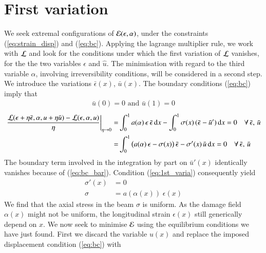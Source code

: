 \documentclass[final,3p,times,authoryear]{elsarticle}
\renewcommand*\d{\mathop{}\!\mathrm{d}} %
\begin{document}
\section{First variation} \label{sec:1st_varia}
%
%
%
%
%
%
%
We seek extremal configurations of ${\cal E}(\epsilon,\alpha)$, under the constraints (\ref{eq:strain_disp}) and (\ref{eq:bc}).
Applying the lagrange multiplier rule, we work with ${\cal L}$ and look for the conditions under which the first variation of ${\cal L}$ vanishes, for the the two variables $\epsilon$ and $\hat{u}$.
The minimisation with regard to the third variable $\alpha$, involving irreversibility conditions, will be considered in a second step.
We introduce the variations $\bar{\epsilon}(x)$, $\bar{u}(x)$. The boundary conditions (\ref{eq:bc}) imply that
\begin{align}
\label{eq:bc_bar}
\bar{u}(0)=0 \text{ and } \bar{u}(1)=0
\end{align}
%
\begin{subequations}
\label{sys:1st_varia}
\begin{align}
\left. \frac{{\cal L}(\epsilon+\eta\bar{\epsilon},\alpha,u+\eta \bar{u})-{\cal L}(\epsilon,\alpha,u)}{\eta} \right|_{\eta \to 0} = &
\int_0^1 a(\alpha) \, \epsilon \, \bar{\epsilon} \d x -
\int_0^1 \sigma(x)  \,  (\bar{\epsilon}-\bar{u}') \d x = 0 \quad \forall \, \bar{\epsilon}, \, \bar{u}
\\
= & \int_0^1 \big( a(\alpha) \, \epsilon - \sigma(x) \big) \, \bar{\epsilon} - \sigma'(x) \, \bar{u} \d x
= 0 \quad \forall \, \bar{\epsilon}, \, \bar{u} \label{eq:1st_varia}
\end{align}
\end{subequations}
The boundary term involved in the integration by part on $\bar{u}'(x)$ identically vanishes because of (\ref{eq:bc_bar}).
Condition (\ref{eq:1st_varia}) consequently yield
\begin{subequations}
\label{sys:equil_sol}
\begin{align}
\sigma'(x) & =  0 \\
\sigma & =  a(\alpha(x)) \; \epsilon(x) \label{eq:9b}
\end{align}
\end{subequations}
We find that the axial stress in the beam $\sigma$ is uniform. As the damage field $\alpha(x)$ might not be uniform, the longitudinal strain $\epsilon(x)$ still generically depend on $x$.
%
We now seek to minimise ${\cal E}$ using the equilibrium conditions we have just found. First we discard the variable $u(x)$ and replace the imposed displacement condition (\ref{eq:bc}) with
\end{document}
